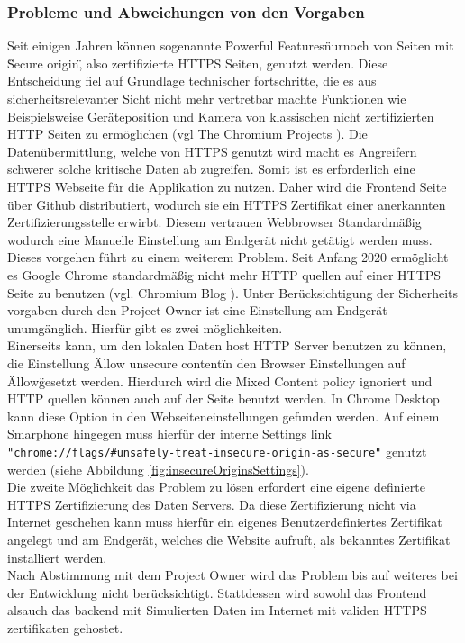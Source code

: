 \subsubsection{Probleme und Abweichungen von den Vorgaben}
Seit einigen Jahren können sogenannte \"Powerful Features\" nurnoch von Seiten mit \"Secure origin\", also zertifizierte HTTPS Seiten, genutzt werden. Diese Entscheidung fiel auf Grundlage technischer fortschritte, die es aus sicherheitsrelevanter Sicht nicht mehr vertretbar machte Funktionen wie Beispielsweise Geräteposition und Kamera von klassischen nicht zertifizierten HTTP Seiten zu ermöglichen (vgl The Chromium Projects \cite{CameraHTTPSOnly}). Die Datenübermittlung, welche von HTTPS genutzt wird macht es Angreifern schwerer solche kritische Daten ab zugreifen. Somit ist es erforderlich eine HTTPS Webseite für die Applikation zu nutzen. Daher wird die Frontend Seite über Github distributiert, wodurch sie ein HTTPS Zertifikat einer anerkannten Zertifizierungsstelle erwirbt. Diesem vertrauen Webbrowser Standardmäßig wodurch eine Manuelle Einstellung am Endgerät nicht getätigt werden muss.\\
Dieses vorgehen führt zu einem weiterem Problem. Seit Anfang 2020 ermöglicht es Google Chrome standardmäßig nicht mehr HTTP quellen auf einer HTTPS Seite zu benutzen (vgl. Chromium Blog \cite{MixedSourcesPolicy}). Unter Berücksichtigung der Sicherheits vorgaben durch den Project Owner ist eine Einstellung am Endgerät unumgänglich. Hierfür gibt es zwei möglichkeiten.\\
Einerseits kann, um den lokalen Daten host HTTP Server benutzen zu können, die Einstellung \"Allow unsecure content\" in den Browser Einstellungen auf \"Allow\" gesetzt werden. Hierdurch wird die Mixed Content policy ignoriert und HTTP quellen können auch auf der Seite benutzt werden. In Chrome Desktop kann diese Option in den Webseiteneinstellungen gefunden werden. Auf einem Smarphone hingegen muss hierfür der interne Settings link \verb|"chrome://flags/#unsafely-treat-insecure-origin-as-secure"| genutzt werden (siehe Abbildung \ref{fig:insecureOriginsSettings}).\\
Die zweite Möglichkeit das Problem zu lösen erfordert eine eigene definierte HTTPS Zertifizierung des Daten Servers. Da diese Zertifizierung nicht via Internet geschehen kann muss hierfür ein eigenes Benutzerdefiniertes Zertifikat angelegt und am Endgerät, welches die Website aufruft, als bekanntes Zertifikat installiert werden.\\ 
Nach Abstimmung mit dem Project Owner wird das Problem bis auf weiteres bei der Entwicklung nicht berücksichtigt. Stattdessen wird sowohl das Frontend alsauch das backend mit Simulierten Daten im Internet mit validen HTTPS zertifikaten gehostet.

